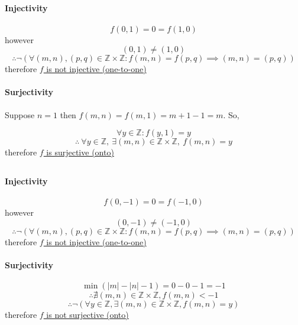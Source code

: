 \documentclass[10pt]{article} %
\begin{document}
\subsection{}
\paragraph{Injectivity}
\[f(0,1) = 0 = f(1,0)\]
however 
\[(0,1) \neq (1,0)\]
\[\therefore \neg \left(\forall (m,n),(p,q) \in \mathbb{Z} \times \mathbb{Z}: f(m,n) = f(p,q) \implies (m,n) = (p,q) \right)
\]
therefore \underline{$f$ is not injective (one-to-one)}

\paragraph{Surjectivity} Suppose $n=1$ then $f(m,n) = f(m,1) = m + 1 -1 = m$. So, 

\[\forall y \in \mathbb{Z}: f(y,1) = y \]
\[\therefore \ \forall y \in \mathbb{Z}, \ \exists (m,n) \in \mathbb{Z} \times \mathbb{Z}, \ f(m,n) =y \]
therefore \underline{$f$ is surjective (onto)}
\subsection{}


\paragraph{Injectivity}
\[f(0,-1) = 0 = f(-1,0)\]
however 
\[(0,-1) \neq (-1,0)\]
\[\therefore \neg \left(\forall (m,n),(p,q) \in \mathbb{Z} \times \mathbb{Z} :f(m,n) = f(p,q) \implies (m,n) = (p,q) \right)
\]
therefore \underline{$f$ is not injective (one-to-one)}


\paragraph{Surjectivity}
\[
  \min(|m| - |n| -1) = 0 - 0 - 1 = -1
\]
\[
  \therefore \nexists (m,n) \in \mathbb{Z} \times \mathbb{Z}, f(m,n) < -1
\]
\[\therefore \neg \left( \forall y \in \mathbb{Z}, \exists (m,n) \in \mathbb{Z} \times \mathbb{Z}, f(m,n) =y \right) \]
therefore \underline{$f$ is not surjective (onto)}


\section{}
\end{document}
